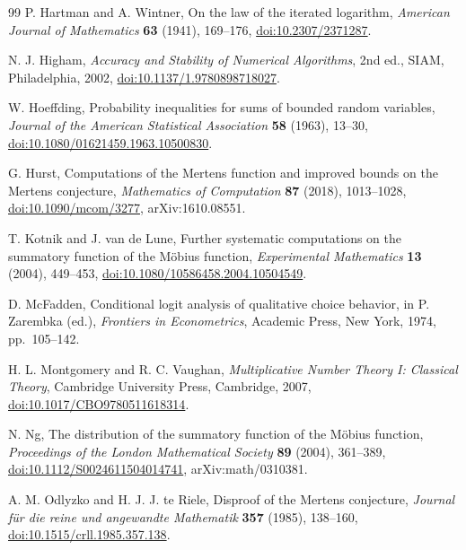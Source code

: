 \documentclass[11pt,reqno]{amsart}
\numberwithin{equation}{section}
\theoremstyle{plain}
\theoremstyle{definition}
\theoremstyle{remark}
\begin{document}
\begin{thebibliography}{99}
P. Hartman and A. Wintner,
\newblock On the law of the iterated logarithm,
\newblock \emph{American Journal of Mathematics} \textbf{63} (1941),
169--176,
\newblock \href{https://doi.org/10.2307/2371287}
{doi:10.2307/2371287}.

N. J. Higham,
\newblock \emph{Accuracy and Stability of Numerical Algorithms}, 2nd ed.,
\newblock SIAM, Philadelphia, 2002,
\newblock \href{https://doi.org/10.1137/1.9780898718027}
{doi:10.1137/1.9780898718027}.

W. Hoeffding,
\newblock Probability inequalities for sums of bounded random variables,
\newblock \emph{Journal of the American Statistical Association}
\textbf{58} (1963), 13--30,
\newblock \href{https://doi.org/10.1080/01621459.1963.10500830}
{doi:10.1080/01621459.1963.10500830}.

G. Hurst,
\newblock Computations of the Mertens function and improved bounds on the
Mertens conjecture,
\newblock \emph{Mathematics of Computation} \textbf{87} (2018), 1013--1028,
\newblock \href{https://doi.org/10.1090/mcom/3277}
{doi:10.1090/mcom/3277}, arXiv:1610.08551.

T. Kotnik and J. van de Lune,
\newblock Further systematic computations on the summatory function of the
M\"obius function,
\newblock \emph{Experimental Mathematics} \textbf{13} (2004), 449--453,
\newblock \href{https://doi.org/10.1080/10586458.2004.10504549}
{doi:10.1080/10586458.2004.10504549}.

D. McFadden,
\newblock Conditional logit analysis of qualitative choice behavior,
\newblock in P. Zarembka (ed.), \emph{Frontiers in Econometrics},
Academic Press, New York, 1974, pp.~105--142.

H. L. Montgomery and R. C. Vaughan,
\newblock \emph{Multiplicative Number Theory I: Classical Theory},
\newblock Cambridge University Press, Cambridge, 2007,
\newblock \href{https://doi.org/10.1017/CBO9780511618314}
{doi:10.1017/CBO9780511618314}.

N. Ng,
\newblock The distribution of the summatory function of the M\"obius
function,
\newblock \emph{Proceedings of the London Mathematical Society}
\textbf{89} (2004), 361--389,
\newblock \href{https://doi.org/10.1112/S0024611504014741}
{doi:10.1112/S0024611504014741}, arXiv:math/0310381.

A. M. Odlyzko and H. J. J. te Riele,
\newblock Disproof of the Mertens conjecture,
\newblock \emph{Journal f\"ur die reine und angewandte Mathematik}
\textbf{357} (1985), 138--160,
\newblock \href{https://doi.org/10.1515/crll.1985.357.138}
{doi:10.1515/crll.1985.357.138}.


\end{thebibliography}
\end{document}
